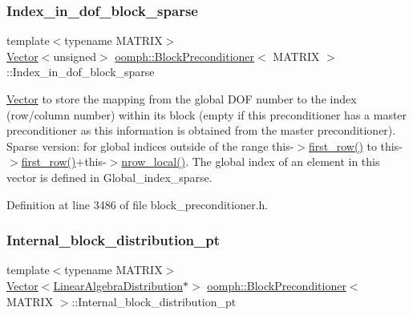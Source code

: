 \subsubsection{\texorpdfstring{Index\+\_\+in\+\_\+dof\+\_\+block\+\_\+sparse}{Index\_in\_dof\_block\_sparse}}
{\footnotesize\ttfamily template$<$typename M\+A\+T\+R\+IX$>$ \\
\hyperlink{classoomph_1_1Vector}{Vector}$<$unsigned$>$ \hyperlink{classoomph_1_1BlockPreconditioner}{oomph\+::\+Block\+Preconditioner}$<$ M\+A\+T\+R\+IX $>$\+::Index\+\_\+in\+\_\+dof\+\_\+block\+\_\+sparse\hspace{0.3cm}{\ttfamily [private]}}



\hyperlink{classoomph_1_1Vector}{Vector} to store the mapping from the global D\+OF number to the index (row/column number) within its block (empty if this preconditioner has a master preconditioner as this information is obtained from the master preconditioner). Sparse version\+: for global indices outside of the range this-\/$>$\hyperlink{classoomph_1_1DistributableLinearAlgebraObject_ab00a3919b8634c698749f14a4d92947d}{first\+\_\+row()} to this-\/$>$\hyperlink{classoomph_1_1DistributableLinearAlgebraObject_ab00a3919b8634c698749f14a4d92947d}{first\+\_\+row()}+this-\/$>$\hyperlink{classoomph_1_1DistributableLinearAlgebraObject_a9bd7e1d242c69a28da85a804a7717fce}{nrow\+\_\+local()}. The global index of an element in this vector is defined in Global\+\_\+index\+\_\+sparse. 



Definition at line 3486 of file block\+\_\+preconditioner.\+h.

\mbox{\label{classoomph_1_1BlockPreconditioner_a38de6514d7065086335e0e6f60dc77a9}} 
\subsubsection{\texorpdfstring{Internal\+\_\+block\+\_\+distribution\+\_\+pt}{Internal\_block\_distribution\_pt}}
{\footnotesize\ttfamily template$<$typename M\+A\+T\+R\+IX$>$ \\
\hyperlink{classoomph_1_1Vector}{Vector}$<$\hyperlink{classoomph_1_1LinearAlgebraDistribution}{Linear\+Algebra\+Distribution}$\ast$$>$ \hyperlink{classoomph_1_1BlockPreconditioner}{oomph\+::\+Block\+Preconditioner}$<$ M\+A\+T\+R\+IX $>$\+::Internal\+\_\+block\+\_\+distribution\+\_\+pt\hspace{0.3cm}{\ttfamily [protected]}}



